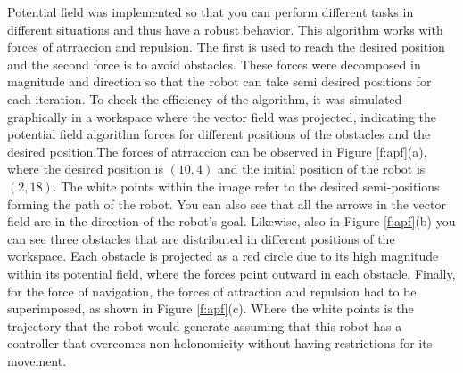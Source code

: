 \documentclass[conference]{IEEEtran}
\begin{document}
Potential field was implemented so that you can perform different tasks in different situations and thus have a robust behavior. This algorithm works with forces of atrraccion and repulsion. The first is used to reach the desired position and the second force is to avoid obstacles. These forces were decomposed in magnitude and direction so that the robot can take semi desired positions for each iteration.
To check the efficiency of the algorithm, it was simulated graphically in a workspace where the vector field was projected, indicating the potential field algorithm forces for different positions of the obstacles and the desired position.The forces of atrraccion can be observed in Figure \ref{f:apf}(a), where the desired position is $ (10,4) $ and the initial position of the robot is $ (2,18) $. The white points within the image refer to the desired semi-positions forming the path of the robot. You can also see that all the arrows in the vector field are in the direction of the robot's goal. Likewise, also in Figure \ref{f:apf}(b) you can see three obstacles that are distributed in different positions of the workspace. Each obstacle is projected as a red circle due to its high magnitude within its potential field, where the forces point outward in each obstacle. Finally, for the force of navigation, the forces of attraction and repulsion had to be superimposed, as shown in Figure \ref{f:apf}(c). Where the white points is the trajectory that the robot would generate assuming that this robot has a controller that overcomes non-holonomicity without having restrictions for its movement.
\end{document}
